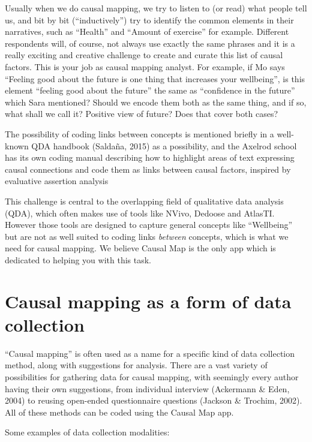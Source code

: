\documentclass[
]{book}
\begin{document}
Usually when we do causal mapping, we try to listen to (or read) what people tell us, and bit by bit (``inductively'') try to identify the common elements in their narratives, such as ``Health'' and ``Amount of exercise'' for example. Different respondents will, of course, not always use exactly the same phrases and it is a really exciting and creative challenge to create and curate this list of causal factors. This is your job as causal mapping analyst. For example, if Mo says ``Feeling good about the future is one thing that increases your wellbeing'', is this element ``feeling good about the future'' the same as ``confidence in the future'' which Sara mentioned? Should we encode them both as the same thing, and if so, what shall we call it? Positive view of future? Does that cover both cases?

The possibility of coding links between concepts is mentioned briefly in a well-known QDA handbook (Saldaña, 2015) as a possibility, and the Axelrod school has its own coding manual describing how to highlight areas of text expressing causal connections and code them as links between causal factors, inspired by evaluative assertion analysis

This challenge is central to the overlapping field of qualitative data analysis (QDA), which often makes use of tools like NVivo, Dedoose and AtlasTI. However those tools are designed to capture general concepts like ``Wellbeing'' but are not as well suited to coding links \emph{between} concepts, which is what we need for causal mapping. We believe Causal Map is the only app which is dedicated to helping you with this task.

\hypertarget{causal-mapping-as-a-form-of-data-collection}{%
\section{Causal mapping as a form of data collection}\label{causal-mapping-as-a-form-of-data-collection}}

``Causal mapping'' is often used as a name for a specific kind of data collection method, along with suggestions for analysis. There are a vast variety of possibilities for gathering data for causal mapping, with seemingly every author having their own suggestions, from individual interview (Ackermann \& Eden, 2004) to reusing open-ended questionnaire questions (Jackson \& Trochim, 2002). All of these methods can be coded using the Causal Map app.

Some examples of data collection modalities:
\end{document}
